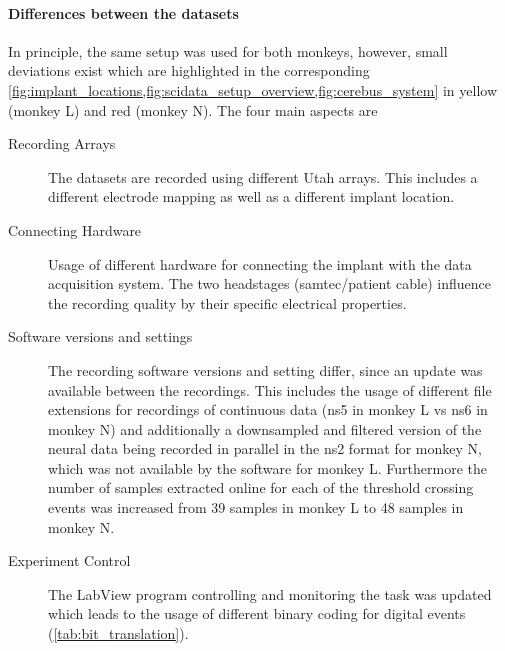 \paragraph{Differences between the datasets}
In principle, the same setup was used for both monkeys, however, small deviations exist which are highlighted in the corresponding \cref{fig:implant_locations,fig:scidata_setup_overview,fig:cerebus_system} in yellow (monkey L) and red (monkey N). The four main aspects are
\begin{description}
 \item[Recording Arrays] The datasets are recorded using different Utah arrays. This includes a different electrode mapping as well as a different implant location.
 \item[Connecting Hardware] Usage of different hardware for connecting the implant with the data acquisition system. The two headstages (samtec/patient cable) influence the recording quality by their specific electrical properties.
 \item[Software versions and settings] The recording software versions and setting differ, since an update was available between the recordings. This includes the usage of different file extensions for recordings of continuous data (ns5 in monkey L vs ns6 in monkey N) and additionally a downsampled and filtered version of the neural data being recorded in parallel in the ns2 format for monkey N, which was not available by the software for monkey L. Furthermore the number of samples extracted online for each of the threshold crossing events was increased from 39 samples in monkey L to 48 samples in monkey N.
 \item[Experiment Control] The LabView program controlling and monitoring the task was updated which leads to the usage of different binary coding for digital events (\cref{tab:bit_translation}). 
\end{description}


